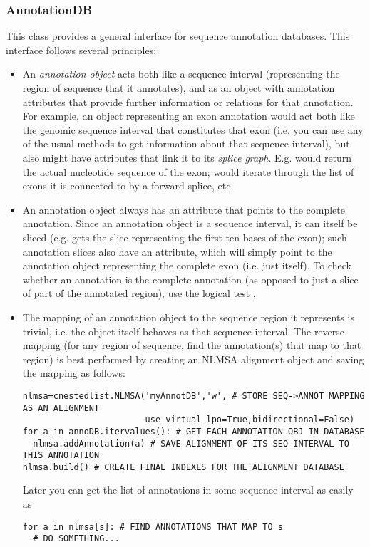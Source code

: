 \documentclass{howto}
\begin{document}
\subsubsection{AnnotationDB}
This class provides a general interface for sequence annotation databases.
This interface follows several principles:
\begin{itemize}
\item An {\em annotation object} acts both like a sequence interval
(representing the region of sequence that it annotates), and as an object
with annotation attributes that provide further information or relations
for that annotation.  For example, an object  representing an exon annotation
would act both like the genomic sequence interval that constitutes that exon
(i.e. you can use any of the usual  methods to get information
about that sequence interval), but also might have attributes that link it
to its {\em splice graph}.  E.g.   would return the actual
nucleotide sequence of the exon;  would iterate
through the list of exons it is connected to by a forward splice, etc.

\item An annotation object always has an  attribute that
points to the complete annotation.  Since an annotation object is a sequence interval,
it can itself be sliced (e.g.  gets the slice representing
the first ten bases of the exon); such annotation slices also have
an  attribute, which will simply point to the annotation
object representing the complete exon (i.e. just  itself).
To check whether an annotation  is the complete annotation
(as opposed to just a slice of part of the annotated region), use the
logical test .

\item The mapping of an annotation object to the sequence region it
represents is trivial, i.e. the object itself behaves as that sequence interval.
The reverse mapping (for any region of sequence, find the annotation(s) 
that map to that region) is best performed by creating an NLMSA alignment
object and saving the mapping as follows:
\begin{verbatim}
nlmsa=cnestedlist.NLMSA('myAnnotDB','w', # STORE SEQ->ANNOT MAPPING AS AN ALIGNMENT
                        use_virtual_lpo=True,bidirectional=False)
for a in annoDB.itervalues(): # GET EACH ANNOTATION OBJ IN DATABASE
  nlmsa.addAnnotation(a) # SAVE ALIGNMENT OF ITS SEQ INTERVAL TO THIS ANNOTATION
nlmsa.build() # CREATE FINAL INDEXES FOR THE ALIGNMENT DATABASE
\end{verbatim}
Later you can get the list of annotations in some sequence interval 
as easily as 
\begin{verbatim}
for a in nlmsa[s]: # FIND ANNOTATIONS THAT MAP TO s
  # DO SOMETHING...
\end{verbatim}

\end{itemize}
\end{document}
